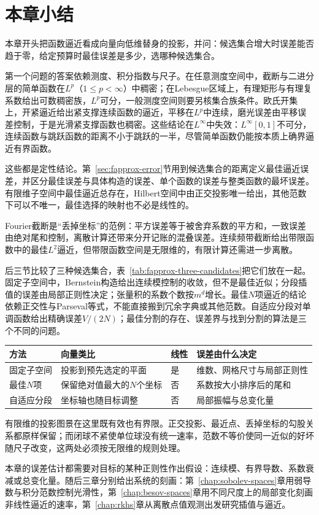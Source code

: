 \section{本章小结}
\label{sec:fapprox-summary}

本章开头把函数逼近看成向量向低维替身的投影，并问：候选集合增大时误差能否趋于零，给定预算时最佳误差是多少，选哪种候选集合。

第一个问题的答案依赖测度、积分指数与尺子。在任意测度空间中，截断与二进分层的简单函数在$L^p$（$1\leq p<\infty$）中稠密；在Lebesgue区域上，有理矩形与有理复系数给出可数稠密族，$L^p$可分，一般测度空间则要另核集合族条件。欧氏开集上，开紧逼近给出紧支撑连续函数的逼近，平移在$L^p$中连续，磨光误差由平移误差控制，于是光滑紧支撑函数也稠密。这些结论在$L^\infty$中失效：$L^\infty[0,1]$不可分，连续函数与跳跃函数的距离不小于跳跃的一半，尽管简单函数仍能按本质上确界逼近有界函数。

这些都是定性结论。第~\ref{sec:fapprox-error}节用到候选集合的距离定义最佳逼近误差，并区分最佳误差与具体构造的误差、单个函数的误差与整类函数的最坏误差。有限维子空间中最佳逼近总存在，Hilbert空间中由正交投影唯一给出，其他范数下可以不唯一，最佳选择的映射也不必是线性的。

Fourier截断是“丢掉坐标”的范例：平方误差等于被舍弃系数的平方和，一致误差由绝对尾和控制，离散计算还带来分开记账的混叠误差。连续频带截断给出带限函数中的最佳$L^2$逼近，但带限函数空间是无限维的，有限计算还需进一步离散。

后三节比较了三种候选集合，表~\ref{tab:fapprox-three-candidates}把它们放在一起。固定子空间中，Bernstein构造给出连续模控制的收敛，但不是最佳近似；分段插值的误差由局部正则性决定；张量积的系数个数按$m^d$增长。最佳$N$项逼近的结论依赖正交性与Parseval等式，不能直接搬到冗余字典或其他范数。自适应分段对单调函数给出精确误差$V/(2N)$；最佳分割的存在、误差界与找到分割的算法是三个不同的问题。

\begin{BookInlineTable}
  \centering
  \caption{三种低维替身}
  \label{tab:fapprox-three-candidates}
  \begin{tabular}{p{13mm}p{29mm}p{9mm}p{39mm}}
    \toprule
    方法 & 向量类比 & 线性 & 误差由什么决定 \\
    \midrule
    固定子空间 & 投影到预先选定的平面 & 是 & 维数、网格尺寸与局部正则性 \\
    最佳$N$项 & 保留绝对值最大的$N$个坐标 & 否 & 系数按大小排序后的尾和 \\
    自适应分段 & 坐标轴也随目标调整 & 否 & 局部振幅与总变化量 \\
    \bottomrule
  \end{tabular}
\end{BookInlineTable}

有限维的投影图景在这里既有效也有界限。正交投影、最近点、丢掉坐标的勾股关系都原样保留；而闭球不紧使单位球没有统一速率，范数不等价使同一近似的好坏随尺子改变，这两处必须按无限维的规则处理。

本章的误差估计都需要对目标的某种正则性作出假设：连续模、有界导数、系数衰减或总变化量。随后三章分别给出系统的刻画：第~\ref{chap:sobolev-spaces}章用弱导数与积分范数控制光滑性，第~\ref{chap:besov-spaces}章用不同尺度上的局部变化刻画非线性逼近的速率，第~\ref{chap:rkhs}章从离散点值观测出发研究插值与逼近。

